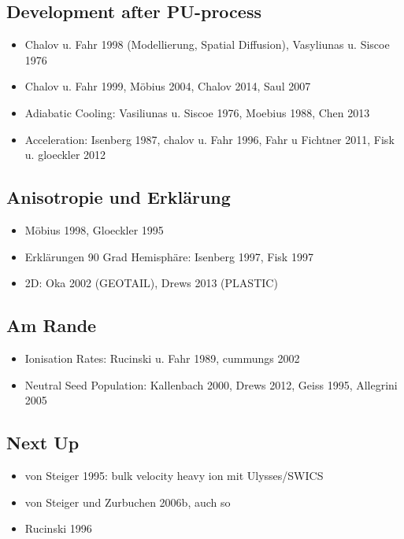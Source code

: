\documentclass[]{article}
\begin{document}
\subsection{Development after PU-process}
\begin{itemize}
	\item Chalov u. Fahr 1998 (Modellierung, Spatial Diffusion), Vasyliunas u. Siscoe 1976
	\item Chalov u. Fahr 1999, Möbius 2004, Chalov 2014, Saul 2007
	\item Adiabatic Cooling: Vasiliunas u. Siscoe 1976, Moebius 1988, Chen 2013
	\item Acceleration: Isenberg 1987, chalov u. Fahr 1996, Fahr u Fichtner 2011, Fisk u. gloeckler 2012
\end{itemize}
%
\subsection{Anisotropie und Erklärung}
\begin{itemize}
	\item Möbius 1998, Gloeckler 1995
	\item Erklärungen 90 Grad Hemisphäre: Isenberg 1997, Fisk 1997
	\item 2D: Oka 2002 (GEOTAIL), Drews 2013 (PLASTIC)
\end{itemize}
%
%
%
\subsection{Am Rande}
\begin{itemize}
	\item Ionisation Rates: Rucinski u. Fahr 1989, cummungs 2002
	\item Neutral Seed Population: Kallenbach 2000, Drews 2012, Geiss 1995, Allegrini 2005
\end{itemize}

\subsection{Next Up}
\begin{itemize}
	\item von Steiger 1995: bulk velocity heavy ion mit Ulysses/SWICS
	\item von Steiger und Zurbuchen 2006b, auch so
	\item Rucinski 1996
\end{itemize}
\newpage
\printbibliography[heading=bibintoc]
\end{document}
